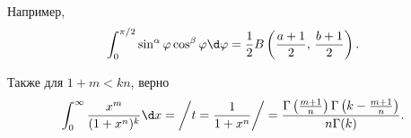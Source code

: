 Например,
\begin{equation*}
    \int_0^{\pi/2} \sin^\alpha \varphi \cos^\beta \varphi \d \varphi =  \frac{1}{2} B\left(\frac{a+1}{2},\, \frac{b+1}{2}\right).
\end{equation*}



Также для $1 + m < kn$, верно
\begin{equation*}
    \int_{0}^{\infty}  \frac{x^m}{(1+x^n)^k} \d x = \bigg/
        t = \frac{1}{1+x^n}
    \bigg/ = \frac{\Gamma \left(\frac{m+1}{n}\right) \Gamma \left(k-\frac{m+1}{n}\right)}{n \Gamma (k)}.
\end{equation*}